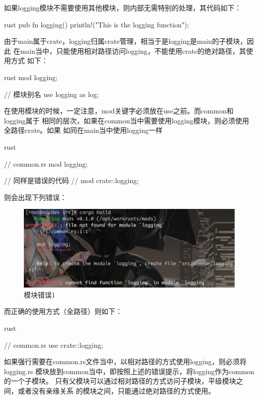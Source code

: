 如果logging模块不需要使用其他模块，则内部无需特别的处理，其代码如下：
\begin{code-block}{rust}
pub fn logging() {
    println!("This is the logging function");
}
\end{code-block}
由于main属于crate，logging归属crate管理，相当于是logging是main的子模块，因此
在main当中，只能使用相对路径访问logging，不能使用crate的绝对路径，其使用方式
如下：
\begin{code-block}{rust}
mod logging;

// 模块别名
use logging as log;
\end{code-block}
在使用模块的时候，一定注意，mod关键字必须放在use之前。而common和logging属于
相同的层次，如果在common当中需要使用logging模块，则必须使用全路径crate。如果
如同在main当中使用logging一样
\begin{code-block}{rust}

// common.rs
mod logging;


// 同样是错误的代码
// mod crate::logging;
\end{code-block}
则会出现下列错误：
\begin{figure}[H]
  \centering
  \includegraphics[width=\linewidth]{rust_mod_error1.png}
  \caption{模块错误1}
  \label{fig:rust_mod_error1}
\end{figure}
而正确的使用方式（全路径）则如下：
\begin{code-block}{rust}

// common.rs
use crate::logging;

\end{code-block}

如果强行需要在common.rs文件当中，以相对路径的方式使用logging，则必须将logging.rs
模块放到common当中，即按照上述的错误提示，将logging作为common的一个子模块。
只有父模块可以通过相对路径的方式访问子模块，平级模块之间，或者没有亲缘关系
的模块之间，只能通过绝对路径的方式使用。

